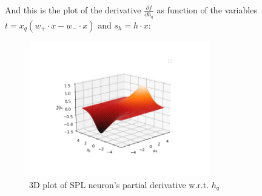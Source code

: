 \documentclass[sn-apa]{sn-jnl}%
\begin{document}
And this is the plot of the derivative $\frac{\partial f}{\partial h_q}$ as function of the variables $t=x_q(w_+ \cdot x - w_- \cdot x)$ and $s_h=h \cdot x$:

\begin{figure}[H]
\centering
\includegraphics[width=0.7\textwidth]{spl_neuron_h_partial_derivative_3d_surface.png}
\caption{3D plot of SPL neuron's partial derivative w.r.t. $h_q$}\label{fig6}
\end{figure}
\end{document}
